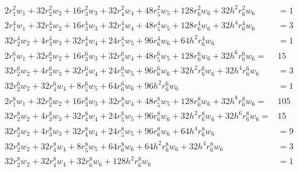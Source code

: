 \documentclass[letterpaper, 10 pt, conference]{IEEEtran}  %
\begin{document}
\footnotesize
\begin{align}
2r_1^2w_1+32r_2^2w_2+16r_3^2w_3+32r_4^2w_4+48r_5^2w_5+128r_6^2w_6+32h^2r_6^2w_6&=1\nonumber\\
2r_1^4w_1+32r_2^4w_2+16r_3^4w_3+32r_4^4w_4+48r_5^4w_5+128r_6^4w_6+32h^4r_6^4w_6&=3\nonumber\\
32r_2^4w_2+4r_3^4w_3+32r_4^4w_4+24r_5^4w_5+96r_6^4w_6+64h^2r_6^4w_6&=1\nonumber\\
2r_1^6w_1+32r_2^6w_2+16r_3^6w_3+32r_4^6w_4+48r_5^6w_5+128r_6^6w_6+32h^6r_6^6w_6=&15\nonumber\\
32r_2^6w_2+4r_3^6w_3+32r_4^6w_4+24r_5^6w_5+96r_6^6w_6+32h^2r_6^6w_6+32h^4r_6^6w_6&=3\nonumber\\
32r_2^6w_2+32r_4^6w_4+8r_5^6w_5+64r_6^6w_6+96h^2r_6^6w_6&=1\nonumber\\
2r_1^8w_1+32r_2^8w_2+16r_3^8w_3+32r_4^8w_4+48r_5^8w_5+128r_6^8w_6+32h^8r_6^8w_6=&105\nonumber\\
32r_2^8w_2+4r_3^8w_3+32r_4^8w_4+24r_5^8w_5+96r_6^8w_6+32h^2r_6^8w_6+32h^6r_6^8w_6=&15\nonumber\\
32r_2^8w_2+4r_3^8w_3+32r_4^8w_4+24r_5^8w_5+96r_6^8w_6+64h^4r_6^8w_6&=9\nonumber\\
32r_2^8w_2+32r_4^8w_4+8r_5^8w_5+64r_6^8w_6+64h^2r_6^8w_6+32h^4r_6^8w_6&=3\nonumber\\
32r_2^8w_2+32r_4^8w_4+32r_6^8w_6+128h^2r_6^8w_6&=1 \label{8thmom5deqns}
\end{align}
\normalsize
\end{document}
